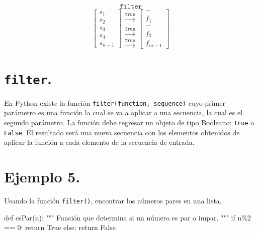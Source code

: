 \documentclass[
  letterpaper,
  DIV=11,
  numbers=noendperiod]{scrreprt}
\newenvironment{Shaded}{\begin{snugshade}}{\end{snugshade}}
\newcommand{\CommentTok}[1]{\textcolor[rgb]{0.37,0.37,0.37}{#1}}
\newcommand{\ControlFlowTok}[1]{\textcolor[rgb]{0.00,0.23,0.31}{#1}}
\newcommand{\DecValTok}[1]{\textcolor[rgb]{0.68,0.00,0.00}{#1}}
\newcommand{\KeywordTok}[1]{\textcolor[rgb]{0.00,0.23,0.31}{#1}}
\newcommand{\NormalTok}[1]{\textcolor[rgb]{0.00,0.23,0.31}{#1}}
\newcommand{\OperatorTok}[1]{\textcolor[rgb]{0.37,0.37,0.37}{#1}}
\newcommand{\VariableTok}[1]{\textcolor[rgb]{0.07,0.07,0.07}{#1}}
\begin{document}
\[
\texttt{filter} 
\] \[
\left[
\begin{matrix}
s_1 \\ s_2 \\ s_3 \\ s_4 \\ s_{n-1} 
\end{matrix}
\right]
\begin{matrix}
\\ \xrightarrow{\texttt{True}} \\  \\ \xrightarrow{\texttt{True}}  \\ \xrightarrow{\texttt{True}}   
\end{matrix}
\left[
\begin{matrix}
- \\ f_1 \\ - \\ f_2 \\ f_{m-1} 
\end{matrix}
\right]
\]

\section{\texorpdfstring{\texttt{filter}.}{filter.}}\label{filter.}

En Python existe la función \texttt{filter(function,\ sequence)} cuyo
primer parámetro es una función la cual se va a aplicar a una secuencia,
la cual es el segundo parámetro. La función debe regresar un objeto de
tipo Booleano: \texttt{True} o \texttt{False}. El resultado será una
nueva secuencia con los elementos obtenidos de aplicar la función a cada
elemento de la secuencia de entrada.

\section{\texorpdfstring{\textbf{Ejemplo
5.}}{Ejemplo 5.}}\label{ejemplo-5.-1}

Usando la función \texttt{filter()}, encontrar los números pares en una
lista.

\begin{Shaded}
\begin{Highlighting}[]
\KeywordTok{def}\NormalTok{ esPar(n):}
    \CommentTok{"""}
\CommentTok{    Función que determina si un número es par o impar.}
\CommentTok{    """}
    \ControlFlowTok{if}\NormalTok{ n}\OperatorTok{\%}\DecValTok{2} \OperatorTok{==} \DecValTok{0}\NormalTok{:}
        \ControlFlowTok{return} \VariableTok{True}
    \ControlFlowTok{else}\NormalTok{:}
        \ControlFlowTok{return} \VariableTok{False}
\end{Highlighting}
\end{Shaded}
\end{document}
